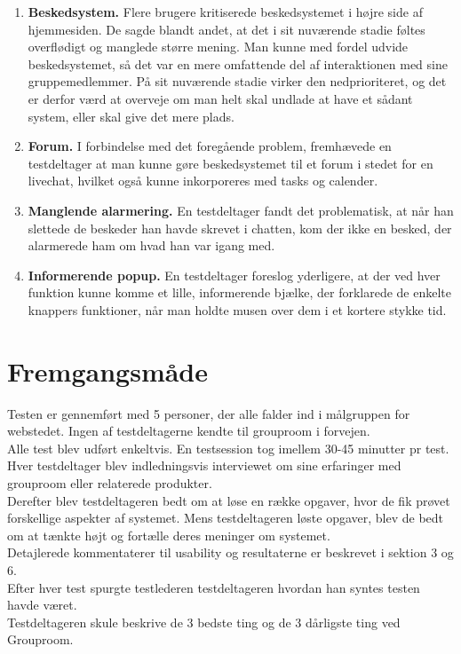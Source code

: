 \documentclass[12pt]{article}
\begin{document}
\begin{enumerate}
  \item \textbf{Beskedsystem.} Flere brugere kritiserede beskedsystemet i højre side af hjemmesiden. De sagde blandt andet, at det i sit nuværende stadie føltes overflødigt og manglede større mening. Man kunne med fordel udvide beskedsystemet, så det var en mere omfattende del af interaktionen med sine gruppemedlemmer. På sit nuværende stadie virker den nedprioriteret, og det er derfor værd at overveje om man helt skal undlade at have et sådant system, eller skal give det mere plads.

  \item \textbf{Forum.} I forbindelse med det foregående problem, fremhævede en testdeltager at man kunne gøre beskedsystemet til et forum i stedet for en livechat, hvilket også kunne inkorporeres med tasks og calender.
  
  \item \textbf{Manglende alarmering.} En testdeltager fandt det problematisk, at når han slettede de beskeder han havde skrevet i chatten, kom der ikke en besked, der alarmerede ham om hvad han var igang med.
  
  \item \textbf{Informerende popup.} En testdeltager foreslog yderligere, at der ved hver funktion kunne komme et lille, informerende bjælke, der forklarede de enkelte knappers funktioner, når man holdte musen over dem i et kortere stykke tid.
\end{enumerate}

\section{Fremgangsmåde}
Testen er gennemført med 5 personer, der alle falder ind i målgruppen for webstedet. Ingen af testdeltagerne kendte til grouproom i forvejen.\\

\noindent Alle test blev udført enkeltvis. En testsession tog imellem 30-45 minutter pr test. Hver testdeltager blev indledningsvis interviewet om sine erfaringer med grouproom eller relaterede produkter. \\

\noindent Derefter blev testdeltageren bedt om at løse en række opgaver, hvor de fik prøvet forskellige aspekter af systemet. Mens testdeltageren løste opgaver, blev de bedt om at tænkte højt og fortælle deres meninger om systemet.\\
Detajlerede kommentaterer til usability og resultaterne er beskrevet i sektion 3 og 6.\\
Efter hver test spurgte testlederen testdeltageren hvordan han syntes testen havde været. \\
Testdeltageren skule beskrive de 3 bedste ting og de 3 dårligste ting ved Grouproom. \\
\end{document}
